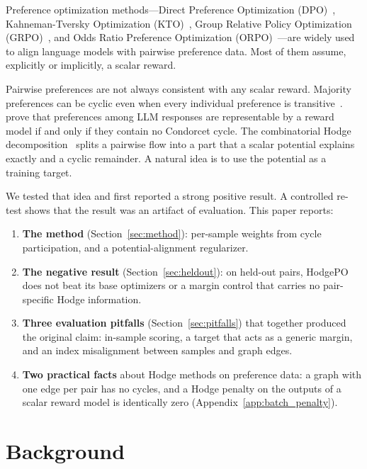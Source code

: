 \documentclass{article}
\begin{document}
Preference optimization methods---Direct Preference Optimization (DPO)~\citep{rafailov2023direct}, Kahneman-Tversky Optimization (KTO)~\citep{ethayarajh2024kto}, Group Relative Policy Optimization (GRPO)~\citep{shao2024deepseekmath}, and Odds Ratio Preference Optimization (ORPO)~\citep{hong2024orpo}---are widely used to align language models with pairwise preference data. Most of them assume, explicitly or implicitly, a scalar reward.

Pairwise preferences are not always consistent with any scalar reward. Majority preferences can be cyclic even when every individual preference is transitive~\citep{condorcet1785essai, arrow1950difficulty}. \citet{liu2025impossibility} prove that preferences among LLM responses are representable by a reward model if and only if they contain no Condorcet cycle. The combinatorial Hodge decomposition~\citep{hodge1941harmonic, jiang2011statistical} splits a pairwise flow into a part that a scalar potential explains exactly and a cyclic remainder. A natural idea is to use the potential as a training target.

We tested that idea and first reported a strong positive result. A controlled re-test shows that the result was an artifact of evaluation. This paper reports:
\begin{enumerate}
    \item \textbf{The method} (Section~\ref{sec:method}): per-sample weights from cycle participation, and a potential-alignment regularizer.
    \item \textbf{The negative result} (Section~\ref{sec:heldout}): on held-out pairs, HodgePO does not beat its base optimizers or a margin control that carries no pair-specific Hodge information.
    \item \textbf{Three evaluation pitfalls} (Section~\ref{sec:pitfalls}) that together produced the original claim: in-sample scoring, a target that acts as a generic margin, and an index misalignment between samples and graph edges.
    \item \textbf{Two practical facts} about Hodge methods on preference data: a graph with one edge per pair has no cycles, and a Hodge penalty on the outputs of a scalar reward model is identically zero (Appendix~\ref{app:batch_penalty}).
\end{enumerate}

\section{Background}
\label{sec:background}
\end{document}

